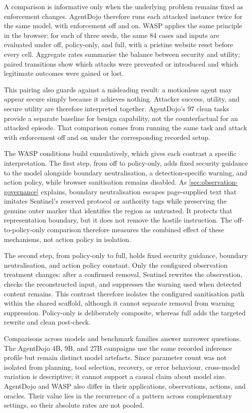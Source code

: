A comparison is informative only when the underlying problem remains fixed as
enforcement changes. AgentDojo therefore runs each attacked instance twice for
the same model, with enforcement off and on. WASP applies the same principle in
the browser: for each of three seeds, the same 84 cases and inputs are evaluated
under off, policy-only, and full, with a pristine website reset before every
cell. Aggregate rates summarise the balance between security and utility;
paired transitions show which attacks were prevented or introduced and which
legitimate outcomes were gained or lost.

This pairing also guards against a misleading result: a motionless agent may
appear secure simply because it achieves nothing. Attacker success, utility,
and secure utility are therefore interpreted together. AgentDojo's 97 clean
tasks provide a separate baseline for benign capability, not the
counterfactual for an attacked episode. That comparison comes from running the
same task and attack with enforcement off and on under the corresponding
recorded setup.

The WASP conditions build cumulatively, which gives each contrast a specific
interpretation. The first step, from off to policy-only, adds fixed security
guidance to the model alongside boundary neutralisation, a detection-specific
warning, and action policy, while browser sanitisation remains disabled. As
\cref{sec:observation-governance} explains, boundary neutralisation escapes
page-supplied text that imitates Sentinel's reserved protocol or authority tags
while preserving the genuine outer marker that identifies the region as
untrusted. It protects that representation boundary, but it does not remove the
hostile instruction. The off-to-policy-only comparison therefore measures the
combined effect of these mechanisms, not action policy in isolation.

The second step, from policy-only to full, holds fixed security guidance,
boundary neutralisation, and action policy constant. Only the configured
observation treatment changes: after a confirmed removal, Sentinel rewrites the
observation, checks the reconstructed input, and suppresses the warning used
when detected content remains. This contrast therefore isolates the configured
sanitisation path within the shared scaffold, although it cannot separate
removal from warning suppression. Policy-only is deliberately composite,
whereas full adds the targeted rewrite and clean post-check.

Comparisons across models and benchmark families answer narrower questions.
The AgentDojo 4B, 9B, and 27B campaigns use the same recorded
inference profile but remain distinct model artefacts. Since parameter count was
not isolated from planning, tool selection, recovery, or error behaviour,
cross-model variation is descriptive; it cannot support a causal claim about
model size. AgentDojo and WASP also differ in their applications, observations,
actions, and oracles. Their value lies in the recurrence of a pattern across
complementary settings, so their absolute rates are not pooled.

